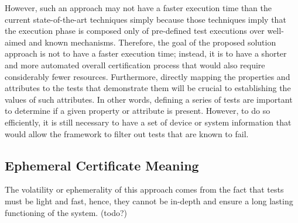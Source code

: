 However, such an approach may not have a faster execution time than the current state-of-the-art techniques simply because those techniques imply that the execution phase is composed only of pre-defined test executions over well-aimed and known mechanisms. Therefore, the goal of the proposed solution approach is not to have a faster execution time; instead, it is to have a shorter and more automated overall certification process that would also require considerably fewer resources. Furthermore, directly mapping the properties and attributes to the tests that demonstrate them will be crucial to establishing the values of such attributes. In other words, defining a series of tests are important to determine if a given property or attribute is present. However, to do so efficiently, it is still necessary to have a set of device or system information that would allow the framework to filter out tests that are known to fail.


\subsection{Ephemeral Certificate Meaning}
The volatility or ephemerality of this approach comes from the fact that tests must be light and fast, hence, they cannot be in-depth and ensure a long lasting functioning of the system. (todo?)
